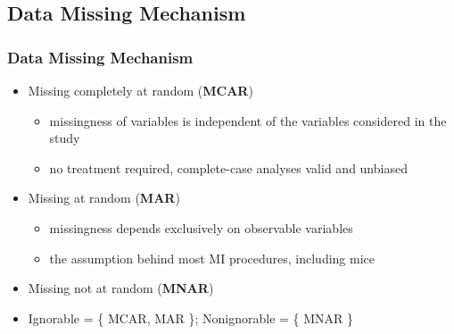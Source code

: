 \documentclass[UKenglish
  pdftex                    %
  dvipsnames                %
]{beamer}
\newcommand{\tmark}{\textcolor{blue}{\ding{51}}}
\newcommand{\pk}[1]{\textcolor{Rblue}{\textsf{#1}}}
\begin{document}
\subsection{Data Missing Mechanism}
\begin{frame}\frametitle{Data Missing Mechanism \small\parencite{rubin:1976}}

\begin{itemize}
  \item Missing completely at random (\textbf{MCAR})
    \begin{itemize}
      \item[\ding{46}] \textcolor{uiogrey5}{missingness of variables is independent of the variables considered in the study}
      \item[\tmark] \textcolor{uiogrey5}{no treatment required, complete-case analyses valid and unbiased}
    \end{itemize}

    \item Missing at random (\textbf{MAR})
  \begin{itemize}
    \item[\ding{46}] \textcolor{uiogrey5}{missingness depends exclusively on observable variables}
    \item[\tmark] \textcolor{uiogrey5}{the assumption behind most MI procedures, including \pk{mice}}
  \end{itemize}

  \item Missing not at random (\textbf{MNAR})

  \item[\ding{108}] Ignorable = \{ MCAR, MAR \}; Nonignorable = \{ MNAR \}
\end{itemize}

\end{frame}
\end{document}
